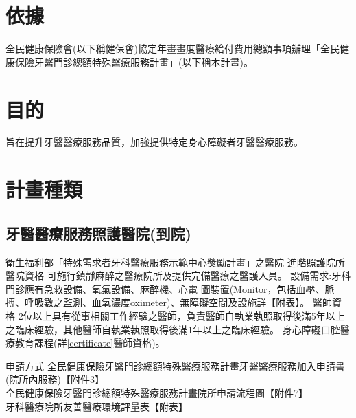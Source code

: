 \section{依據}
全民健康保險會(以下稱健保會)協定年畫畫度醫療給付費用總額事項辦理「全民健康保險牙醫門診總額特殊醫療服務計畫」(以下稱本計畫)。

\section{目的} 旨在提升牙醫醫療服務品質，加強提供特定身心障礙者牙醫醫療服務。

\section{計畫種類}

\subsection{牙醫醫療服務照護醫院(到院)}
\begin{outline}

\1 衛生福利部「特殊需求者牙科醫療服務示範中心獎勵計畫」之醫院 
\1 進階照護院所
\2 醫院資格
    \3 可施行鎮靜麻醉之醫療院所及提供完備醫療之醫護人員。
    \3 設備需求:牙科門診應有急救設備、氧氣設備、麻醉機、心電 圖裝置(Monitor，包括血壓、脈搏、呼吸數之監測、血氧濃度oximeter)、無障礙空間及設施詳【附表】。
\2 醫師資格
    \3 2位以上具有從事相關工作經驗之醫師，負責醫師自執業執照取得後滿5年以上之臨床經驗，其他醫師自執業執照取得後滿1年以上之臨床經驗。
    \3 身心障礙口腔醫療教育課程(詳\ref{certificate}醫師資格)。

\0 申請方式
\1 全民健康保險牙醫門診總額特殊醫療服務計畫牙醫醫療服務加入申請書(院所內服務)【附件3】\\
\1 全民健康保險牙醫門診總額特殊醫療服務計畫院所申請流程圖【附件7】\\
\1 牙科醫療院所友善醫療環境評量表【附表】

\end{outline}


